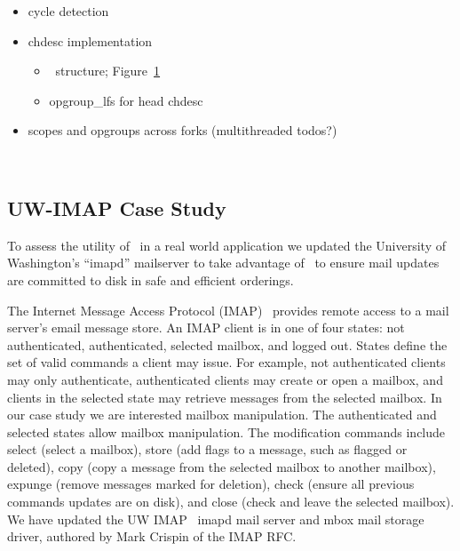 \begin{itemize}
\item cycle detection
\item chdesc implementation
  \begin{itemize}
  \item \chdesc\ structure; Figure~\ref{fig:opgroup-chdescs}
  \item opgroup\_lfs for head chdesc
  \end{itemize}
\item scopes and opgroups across forks (multithreaded todos?)
\end{itemize}

\begin{figure}[htb]
\caption{\label{fig:opgroup-chdescs} \Opgroup\ \Chdescs}
\end{figure}

\subsection{UW-IMAP Case Study}
\label{sec:opgroup:uwimap}

To assess the utility of \opgroups\ in a real world application we
updated the University of Washington's ``imapd'' mailserver to take
advantage of \opgroups\ to ensure mail updates are committed to disk
in safe and efficient orderings.

The Internet Message Access Protocol (IMAP)~\cite{rfc3501} provides
remote access to a mail server's email message store. An IMAP client
is in one of four states: not authenticated, authenticated, selected
mailbox, and logged out. States define the set of valid commands a
client may issue. For example, not authenticated clients may only
authenticate, authenticated clients may create or open a mailbox, and
clients in the selected state may retrieve messages from the selected
mailbox. In our case study we are interested mailbox manipulation. The
authenticated and selected states allow mailbox manipulation. The
modification commands include select (select a mailbox), store (add
flags to a message, such as flagged or deleted), copy (copy a message
from the selected mailbox to another mailbox), expunge (remove
messages marked for deletion), check (ensure all previous commands
updates are on disk), and close (check and leave the selected
mailbox). We have updated the UW IMAP~\cite{uwimap} imapd mail server
and mbox mail storage driver, authored by Mark Crispin of the IMAP RFC.

